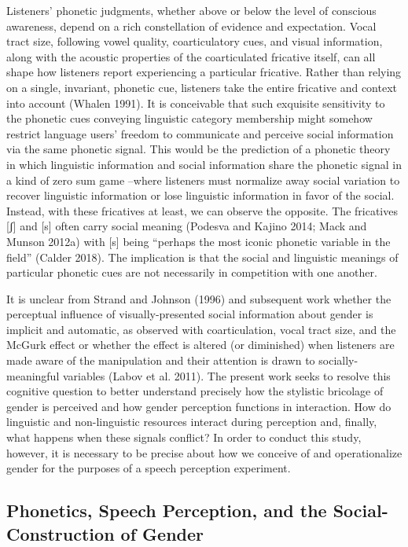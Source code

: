 \documentclass[
  letterpaper,
  DIV=11,
  numbers=noendperiod]{scrartcl}
\begin{document}
Listeners' phonetic judgments, whether above or below the level of
conscious awareness, depend on a rich constellation of evidence and
expectation. Vocal tract size, following vowel quality, coarticulatory
cues, and visual information, along with the acoustic properties of the
coarticulated fricative itself, can all shape how listeners report
experiencing a particular fricative. Rather than relying on a single,
invariant, phonetic cue, listeners take the entire fricative and context
into account (Whalen 1991). It is conceivable that such exquisite
sensitivity to the phonetic cues conveying linguistic category
membership might somehow restrict language users' freedom to communicate
and perceive social information via the same phonetic signal. This would
be the prediction of a phonetic theory in which linguistic information
and social information share the phonetic signal in a kind of zero sum
game --where listeners must normalize away social variation to recover
linguistic information or lose linguistic information in favor of the
social. Instead, with these fricatives at least, we can observe the
opposite. The fricatives {[}ʃ{]} and {[}s{]} often carry social meaning
(Podesva and Kajino 2014; Mack and Munson 2012a) with {[}s{]} being
``perhaps the most iconic phonetic variable in the field'' (Calder
2018). The implication is that the social and linguistic meanings of
particular phonetic cues are not necessarily in competition with one
another.

It is unclear from Strand and Johnson (1996) and subsequent work whether
the perceptual influence of visually-presented social information about
gender is implicit and automatic, as observed with coarticulation, vocal
tract size, and the McGurk effect or whether the effect is altered (or
diminished) when listeners are made aware of the manipulation and their
attention is drawn to socially-meaningful variables (Labov et al. 2011).
The present work seeks to resolve this cognitive question to better
understand precisely how the stylistic bricolage of gender is perceived
and how gender perception functions in interaction. How do linguistic
and non-linguistic resources interact during perception and, finally,
what happens when these signals conflict? In order to conduct this
study, however, it is necessary to be precise about how we conceive of
and operationalize gender for the purposes of a speech perception
experiment.

\subsection{Phonetics, Speech Perception, and the Social-Construction of
Gender}\label{sub-gender}
\end{document}
